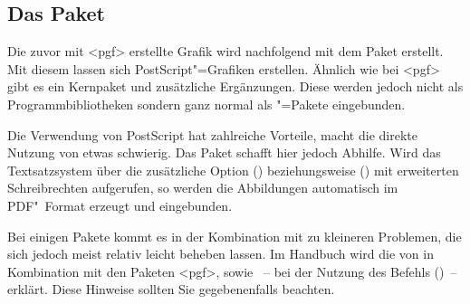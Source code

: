 \documentclass[%
  english,ngerman,%
  cdgeometry=no,DIV=12,automark%
]{tudscrartcl}
\begin{document}
\subsection{Das Paket }
Die zuvor mit <pgf> erstellte Grafik wird nachfolgend mit dem 
Paket  erstellt. Mit diesem lassen sich PostScript"=Grafiken 
erstellen. Ähnlich wie bei <pgf> gibt es ein Kernpaket und 
zusätzliche Ergänzungen. Diese werden jedoch nicht als Programmbibliotheken 
sondern ganz normal als "=Pakete eingebunden.
%
\begin{Hint}
\usepackage{pstricks,pst-node}
\end{Hint}
%
Die Verwendung von PostScript hat zahlreiche Vorteile, macht die direkte 
Nutzung von  etwas schwierig. Das Paket  
schafft hier jedoch Abhilfe. Wird das Textsatzsystem  über die 
zusätzliche Option () beziehungsweise 
() mit erweiterten Schreibrechten 
aufgerufen, so werden die Abbildungen automatisch im PDF"~Format erzeugt und 
eingebunden.
%
\begin{Hint}
\usepackage{auto-pst-pdf}
\end{Hint}
%
Bei einigen Pakete kommt es in der Kombination mit  zu 
kleineren Problemen, die sich jedoch meist relativ leicht beheben lassen. Im 
Handbuch wird die  
von  in Kombination mit den Paketen <pgf>, 
 sowie ~-- bei der Nutzung des Befehls 
()~-- erklärt. Diese Hinweise sollten Sie 
gegebenenfalls beachten.
\end{document}
